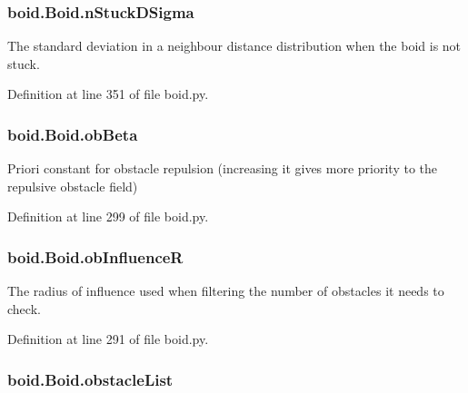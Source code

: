 \hypertarget{classboid_1_1Boid_add42a1be4f79d1ae8990065fa7e5d4de}{
\subsubsection[{n\-Stuck\-D\-Sigma}]{\setlength{\rightskip}{0pt plus 5cm}boid.\-Boid.\-n\-Stuck\-D\-Sigma}}\label{classboid_1_1Boid_add42a1be4f79d1ae8990065fa7e5d4de}


The standard deviation in a neighbour distance distribution when the boid is not stuck. 



Definition at line 351 of file boid.\-py.

\hypertarget{classboid_1_1Boid_a222ad56335a1e1ea39dd6da9e21797c5}{
\subsubsection[{ob\-Beta}]{\setlength{\rightskip}{0pt plus 5cm}boid.\-Boid.\-ob\-Beta}}\label{classboid_1_1Boid_a222ad56335a1e1ea39dd6da9e21797c5}


Priori constant for obstacle repulsion (increasing it gives more priority to the repulsive obstacle field) 



Definition at line 299 of file boid.\-py.

\hypertarget{classboid_1_1Boid_abc5327f9ad46170e5f57d89c2c6e18e9}{
\subsubsection[{ob\-Influence\-R}]{\setlength{\rightskip}{0pt plus 5cm}boid.\-Boid.\-ob\-Influence\-R}}\label{classboid_1_1Boid_abc5327f9ad46170e5f57d89c2c6e18e9}


The radius of influence used when filtering the number of obstacles it needs to check. 



Definition at line 291 of file boid.\-py.

\hypertarget{classboid_1_1Boid_a9db9b88d02af40d3773b034560959694}{
\subsubsection[{obstacle\-List}]{\setlength{\rightskip}{0pt plus 5cm}boid.\-Boid.\-obstacle\-List}}\label{classboid_1_1Boid_a9db9b88d02af40d3773b034560959694}


